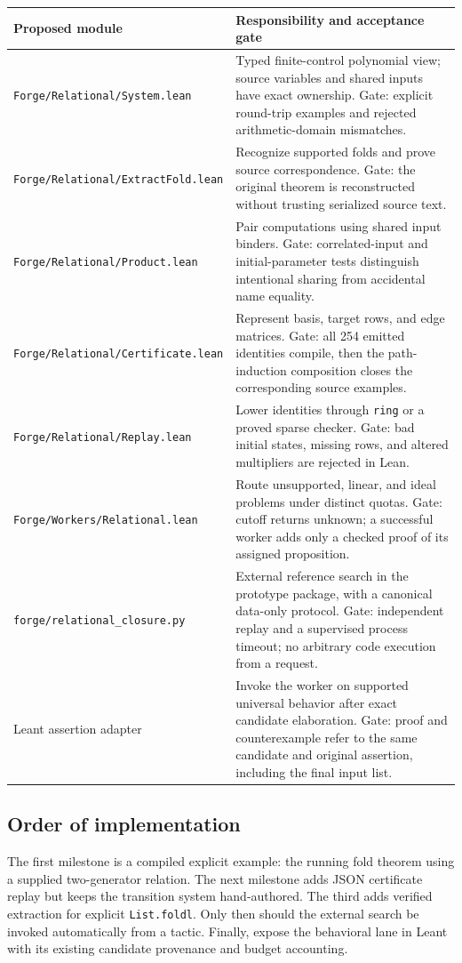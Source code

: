 \documentclass[11pt,letterpaper]{article}
\theoremstyle{definition}
\newcommand{\code}[1]{\nolinkurl{#1}}
\begin{document}
\begin{longtable}{@{}p{.36\linewidth}p{.57\linewidth}@{}}
\toprule
Proposed module & Responsibility and acceptance gate\\
\midrule\endhead
\code{Forge/Relational/System.lean} & Typed finite-control polynomial view;
source variables and shared inputs have exact ownership. Gate: explicit round-trip
examples and rejected arithmetic-domain mismatches.\\[.7em]
\code{Forge/Relational/ExtractFold.lean} & Recognize supported folds and prove
source correspondence. Gate: the original theorem is reconstructed without trusting
serialized source text.\\[.7em]
\code{Forge/Relational/Product.lean} & Pair computations using shared input
binders. Gate: correlated-input and initial-parameter tests distinguish intentional
sharing from accidental name equality.\\[.7em]
\code{Forge/Relational/Certificate.lean} & Represent basis, target rows, and
edge matrices. Gate: all 254 emitted identities compile, then the path-induction
composition closes the corresponding source examples.\\[.7em]
\code{Forge/Relational/Replay.lean} & Lower identities through \code{ring}
or a proved sparse checker. Gate: bad initial states, missing rows, and altered
multipliers are rejected in Lean.\\[.7em]
\code{Forge/Workers/Relational.lean} & Route unsupported, linear, and ideal
problems under distinct quotas. Gate: cutoff returns unknown; a successful worker
adds only a checked proof of its assigned proposition.\\[.7em]
\code{forge/relational_closure.py} & External reference search in the
prototype package, with a canonical data-only protocol. Gate: independent replay
and a supervised process timeout; no arbitrary code execution from a request.\\[.7em]
Leant assertion adapter & Invoke the worker on supported universal behavior
after exact candidate elaboration. Gate: proof and counterexample refer to the same
candidate and original assertion, including the final input list.\\
\bottomrule
\end{longtable}

\subsection{Order of implementation}
The first milestone is a compiled explicit example: the running fold theorem
using a supplied two-generator relation. The next milestone adds JSON
certificate replay but keeps the transition system hand-authored. The third
adds verified extraction for explicit \code{List.foldl}. Only then should the
external search be invoked automatically from a tactic. Finally, expose the
behavioral lane in Leant with its existing candidate provenance and budget
accounting.
\end{document}
